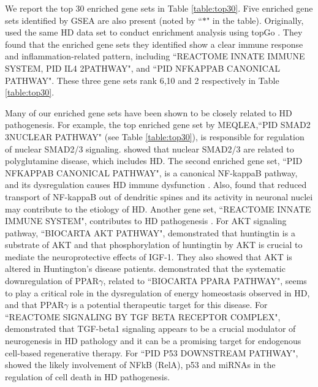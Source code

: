\documentclass[useAMS,usenatbib, galley]{biom}
\newcommand{\OurMethod}{MEQLEA}
\begin{document}
	We report the top 30 enriched gene sets in Table \ref{table:top30}. Five enriched gene sets identified by GSEA are also present (noted by ``$\ast$" in the table). Originally, \cite{labadorf2015rna} used the same HD data set to conduct enrichment analysis using topGo \citep{alexa2010topgo}. They found that the enriched gene sets they identified show a clear immune response and inflammation-related pattern, including ``REACTOME INNATE IMMUNE SYSTEM, PID IL4 2PATHWAY", and ``PID NFKAPPAB CANONICAL PATHWAY". These three gene sets rank 6,10 and 2 respectively in Table \ref{table:top30}.
	
	Many of our enriched gene sets have been shown to be closely related to HD pathogenesis. For example, the top enriched gene set by \OurMethod,``PID SMAD2 3NUCLEAR PATHWAY" (see Table \ref{table:top30}), is responsible for regulation of nuclear SMAD2/3 signaling. \cite{katsuno2010disrupted} showed that nuclear SMAD2/3 are related to polyglutamine disease, which includes HD. The second enriched gene set, ``PID NFKAPPAB CANONICAL PATHWAY", is a canonical NF-kappaB pathway, and its dysregulation causes HD immune dysfunction \citep{trager2014htt}. Also, \cite{marcora2010huntington} found that reduced transport of NF-kappaB out of dendritic spines and its activity in neuronal nuclei may contribute to the etiology of HD. 
	Another gene set, ``REACTOME INNATE IMMUNE SYSTEM", contributes to HD pathogenesis \citep{trager2014htt, labadorf2015rna}. %
	For AKT signaling pathway, ``BIOCARTA AKT PATHWAY", \cite{humbert2002igf} demonstrated that huntingtin is a substrate of AKT and that phosphorylation of huntingtin by AKT is crucial to mediate the neuroprotective effects of IGF-1. They also showed that AKT is altered in Huntington’s disease patients.  
	\cite{chiang2010modulation} demonstrated that the systematic downregulation of PPAR$\gamma$, related to ``BIOCARTA PPARA PATHWAY", seems to play a critical role in the dysregulation of energy homeostasis observed in HD, and that PPAR$\gamma$ is a potential therapeutic target for this disease. For ``REACTOME SIGNALING BY TGF BETA RECEPTOR COMPLEX",  \cite{kandasamy2011transforming} demonstrated that TGF-beta1 signaling appears to be a crucial modulator of neurogenesis in HD pathology and it can be a promising target for endogenous cell-based regenerative therapy. 
	For ``PID P53 DOWNSTREAM PATHWAY", \cite{ghose2011regulation} showed the likely involvement of NFkB (RelA), p53 and miRNAs in the regulation of cell death in HD pathogenesis. 
	
\end{document}
